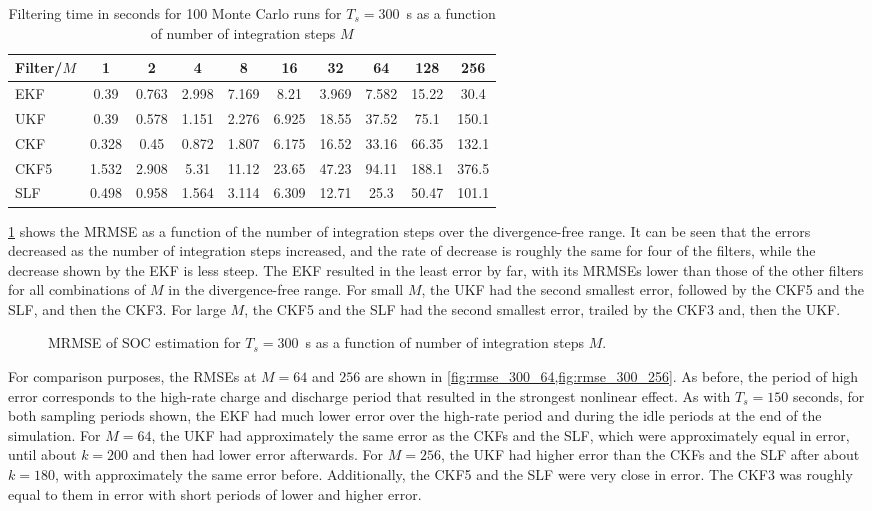 \documentclass[../zhang_thesis.tex]{subfiles}
\begin{document}
\begin{table}[h]
\centering
\caption{Filtering time in seconds for 100 Monte Carlo runs for $T_s=300$~s as a function of number of integration steps $M$}
\begin{tabular}{@{}lccccccccc@{}}
\toprule
Filter/$M$ & 1     & 2     & 4     & 8     & 16    & 32    & 64    & 128   & 256   \\ \midrule
EKF        & 0.39  & 0.763 & 2.998 & 7.169 & 8.21  & 3.969 & 7.582 & 15.22 & 30.4  \\
UKF        & 0.39  & 0.578 & 1.151 & 2.276 & 6.925 & 18.55 & 37.52 & 75.1  & 150.1 \\
CKF        & 0.328 & 0.45  & 0.872 & 1.807 & 6.175 & 16.52 & 33.16 & 66.35 & 132.1 \\
CKF5       & 1.532 & 2.908 & 5.31  & 11.12 & 23.65 & 47.23 & 94.11 & 188.1 & 376.5 \\
SLF        & 0.498 & 0.958 & 1.564 & 3.114 & 6.309 & 12.71 & 25.3  & 50.47 & 101.1 \\ \bottomrule
\end{tabular}
\label{tab:time_300}
\end{table}

\cref{fig:mrmse_300} shows the MRMSE as a function of the number of integration steps over the divergence-free range. It can be seen that the errors decreased as the number of integration steps increased, and the rate of decrease is roughly the same for four of the filters, while the decrease shown by the EKF is less steep. The EKF resulted in the least error by far, with its MRMSEs lower than those of the other filters for all combinations of $M$ in the divergence-free range. For small
$M$, the UKF had the second smallest error, followed by the CKF5 and the SLF, and then the CKF3. For large $M$, the CKF5 and the SLF had the second smallest error, trailed by the CKF3 and, then the UKF.

\begin{figure}[ht]
\centering
%
\caption{MRMSE of SOC estimation for $T_s=300$~s as a function of number of integration steps $M$.}
\label{fig:mrmse_300}
\end{figure}

For comparison purposes, the RMSEs at $M=64$ and $256$ are shown in \cref{fig:rmse_300_64,fig:rmse_300_256}. As before, the period of high error corresponds to the high-rate charge and discharge period that resulted in the strongest nonlinear effect. As with $T_s=150$ seconds, for both sampling periods shown, the EKF had much lower error over the high-rate period and during the idle periods at the end of the simulation. For $M=64$, the UKF had approximately the same error as the CKFs
and the SLF, which were approximately equal in error, until about $k=200$ and then had lower error afterwards. For $M=256$, the UKF had higher error than the CKFs and the SLF after about $k=180$, with approximately the same error before. Additionally, the CKF5 and the SLF were very close in error. The CKF3 was roughly equal to them in error with short periods of lower and higher error.
\end{document}
